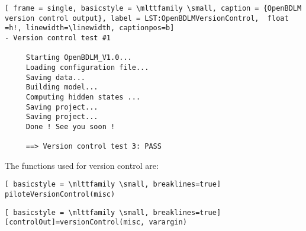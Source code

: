  \begin{lstlisting}[ frame = single, basicstyle = \mlttfamily \small, caption = {OpenBDLM version control output}, label = LST:OpenBDLMVersionControl,  float =h!, linewidth=\linewidth, captionpos=b]
- Version control test #1
 
     Starting OpenBDLM_V1.0...
     Loading configuration file...
     Saving data...
     Building model...
     Computing hidden states ...
     Saving project...
     Saving project...
     Done ! See you soon !
 
     ==> Version control test 3: PASS
\end{lstlisting}

The functions used for version control are:
\begin{description}[style=unboxed]

\item[Pilot function for version control] \leavevmode
  \begin{lstlisting}[ basicstyle = \mlttfamily \small, breaklines=true]
piloteVersionControl(misc)
  \end{lstlisting}

\item[Version control for OpenBDLM] \leavevmode
  \begin{lstlisting}[ basicstyle = \mlttfamily \small, breaklines=true]
[controlOut]=versionControl(misc, varargin)
  \end{lstlisting}

\end{description}